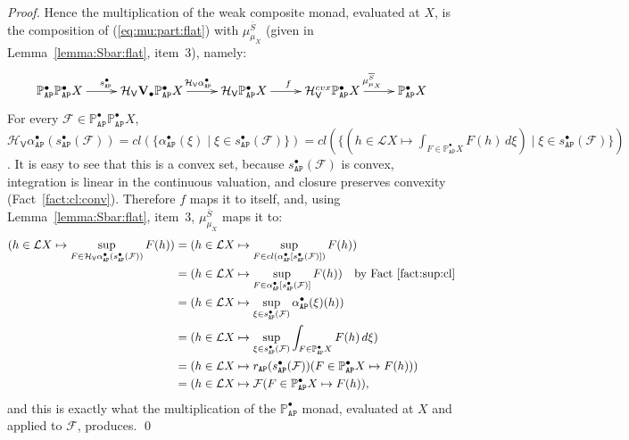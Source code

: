 \documentclass[preprint,12pt]{elsarticle}
\newcommand\Lform{\mathcal L}
\newcommand\Pred{\mathbb{P}}
\newcommand\Angel{{\mathtt{A}}}
\newcommand\Nature{{\mathtt{P}}}
\newcommand\AN{{\Angel\Nature}}
\newcommand\Hoare{{\mathcal H}}
\newcommand\Vt{\mathsf{V}}
\newcommand\HV{\Hoare_\Vt}
\newcommand\Val{{\mathbf V}}
\begin{document}
\begin{proof}
  Hence the multiplication of the weak composite monad, evaluated at
  $X$, is the composition of (\ref{eq:mu:part:flat}) with
  $\mu^{\overline S}_{\mu_X}$ (given in Lemma~\ref{lemma:Sbar:flat},
  item~3), namely:
  \begin{equation}
    \label{eq:Sbarmu:flat}
    \xymatrix{
      \Pred_\AN^\bullet {\Pred_\AN^\bullet X}
      \ar[r]^{s_\AN^\bullet}
      & \HV {\Val_\bullet {\Pred_\AN^\bullet X}}
      \ar[r]^{\HV {\alpha_\AN^\bullet}}
      & \HV {\Pred_\AN^\bullet X}
      \ar[r]^f
      & \HV^{cvx} {\Pred_\AN^\bullet X}
      \ar[r]^{\mu^{\overline S}_{\mu_X}}
      & \Pred_\AN^\bullet X
      }
  \end{equation}
  For every $\mathcal F \in \Pred_\AN^\bullet {\Pred_\AN^\bullet X}$,
  $\HV {\alpha_\AN^\bullet} (s_\AN^\bullet (\mathcal F)) = cl
  (\{\alpha_\AN^\bullet (\xi) \mid \xi \in s_\AN^\bullet (\mathcal
  F)\}) = cl (\{(h \in \Lform X \mapsto \int_{F \in \Pred_\AN^\bullet
    X} F (h) \,d\xi) \mid \xi \in s_\AN^\bullet (\mathcal F)\})$.  It
  is easy to see that this is a convex set, because
  $s_\AN^\bullet (\mathcal F)$ is convex, integration is linear in the
  continuous valuation, and closure preserves convexity
  (Fact~\ref{fact:cl:conv}).  Therefore $f$ maps it to itself, and,
  using Lemma~\ref{lemma:Sbar:flat}, item~3,
  $\mu^{\overline S}_{\mu_X}$ maps it to:
  \begin{align*}
    (h \in \Lform X \mapsto \sup_{F \in \HV {\alpha_\AN^\bullet}
    (s_\AN^\bullet (\mathcal F))} F (h))
    & = (h \in \Lform X \mapsto \sup_{F \in cl (\alpha_\AN^\bullet
      [s_\AN^\bullet (\mathcal F)])}
      F (h)) \\
    & = (h \in \Lform X \mapsto \sup_{F \in \alpha_\AN^\bullet
      [s_\AN^\bullet (\mathcal F)]}
      F (h))
      \quad \text{by Fact~\ref{fact:sup:cl}} \\
    & = (h \in \Lform X \mapsto \sup_{\xi \in s_\AN^\bullet (\mathcal
      F)} \alpha_\AN^\bullet (\xi) (h)) \\
    & = (h \in \Lform X \mapsto \sup_{\xi \in s_\AN^\bullet (\mathcal
      F)} \int_{F \in \Pred_\AN^\bullet X} F (h) \,d\xi) \\
    & = (h \in \Lform X \mapsto  r_\AN (s_\AN^\bullet (\mathcal F)) (F \in \Pred_\AN^\bullet X
      \mapsto F (h))) \\
    & = (h \in \Lform X \mapsto  \mathcal F (F \in \Pred_\AN^\bullet X
      \mapsto F (h)),
  \end{align*}
  and this is exactly what the multiplication of the
  $\Pred_\AN^\bullet$ monad, evaluated at $X$ and applied to
  $\mathcal F$, produces.  \qed
\end{proof}
\end{document}
